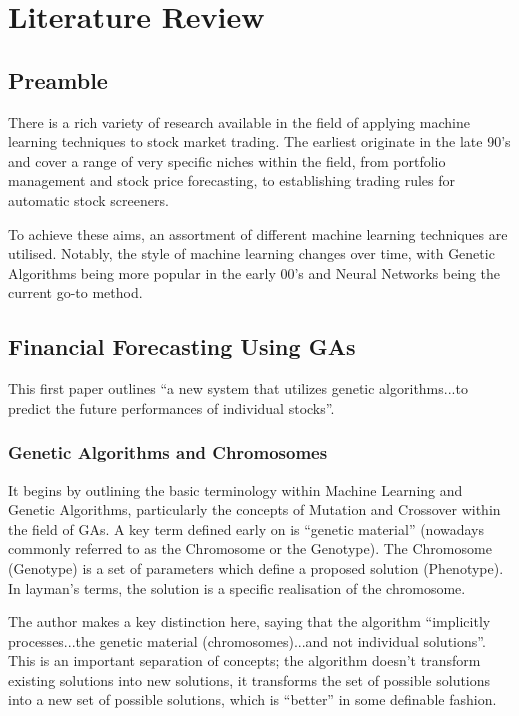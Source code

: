 \section{Literature Review}
\subsection{Preamble}
There is a rich variety of research available in the field of applying machine learning techniques to stock market trading. The earliest originate in the late 90's and cover a range of very specific niches within the field, from portfolio management and stock price forecasting, to establishing trading rules for automatic stock screeners. \newline

To achieve these aims, an assortment of different machine learning techniques are utilised. Notably, the style of machine learning changes over time, with Genetic Algorithms being more popular in the early 00's and Neural Networks being the current go-to method.

\subsection{Financial Forecasting Using GAs \cite{mahfoudMani}}
This first paper outlines ``a new system that utilizes genetic algorithms...to predict the future performances of individual stocks''.

\subsubsection{Genetic Algorithms and Chromosomes}

It begins by outlining the basic terminology within Machine Learning and Genetic Algorithms, particularly the concepts of Mutation and Crossover within the field of GAs. A key term defined early on is ``genetic material'' (nowadays commonly referred to as the Chromosome or the Genotype). The Chromosome (Genotype) is a set of parameters which define a proposed solution (Phenotype). In layman's terms, the solution is a specific realisation of the chromosome. \newline

The author makes a key distinction here, saying that the algorithm ``implicitly processes...the genetic material (chromosomes)...and not individual solutions''. This is an important separation of concepts; the algorithm doesn't transform existing solutions into new solutions, it transforms the set of possible solutions into a new set of possible solutions, which is ``better'' in some definable fashion. \newline


